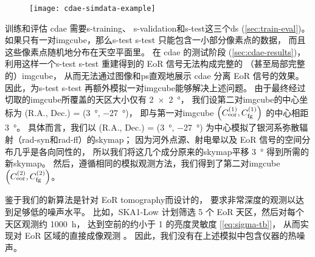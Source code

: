 \begin{figure}[htp]
  \centering
  \texttt{[image: cdae-simdata-example]}
  \label{fig:cdae-simdata}
\end{figure}

训练和评估 \ac{cdae} 需要\acl{s-training}、
\acl{s-validation}和\acl{s-test}这三个\ac{ds} (\autoref{sec:train-eval})。
如果只有一对\ac{imgcube}，那么\acl{s-test} \ac{s-test} 只能包含一小部分像素点的数据，
而且这些像素点随机地分布在天空平面里。
在 \ac{cdae} 的测试阶段 (\autoref{sec:cdae-results})，
利用这样一个\acl{s-test} \ac{s-test} 重建得到的 EoR 信号无法构成完整的
（甚至局部完整的）\ac{imgcube}，
从而无法通过图像和\ac{ps}直观地展示 \ac{cdae} 分离 EoR 信号的效果。
因此，为\acl{s-test} \ac{s-test} 再额外模拟一对\ac{imgcube}能够解决上述问题。
由于最终经过切取的\ac{imgcube}所覆盖的天区大小仅有 \SI{2 x 2}{\degree}，
我们设第二对\ac{imgcube}的中心坐标为
(R.A., Dec.\@) = (\SI{3}{\degree}, \SI{-27}{\degree})，
即与第一对\ac{imgcube}
$\left( C_{\mathrm{eor}}^{(1)}, C_{\mathrm{fg}}^{(1)} \right)$
的中心相距 \SI{3}{\degree}。
具体而言，我们以 (R.A., Dec.\@) = (\SI{3}{\degree}, \SI{-27}{\degree})
为中心模拟了银河系弥散辐射（\ac{rad-syn}和\ac{rad-ff}）的\ac{skymap}；
因为河外点源、射电晕以及 EoR 信号的空间分布几乎是各向同性的，
所以我们将这几个成分原来的\ac{skymap}平移 \SI{3}{\degree} 得到所需的新\ac{skymap}。
然后，遵循相同的模拟观测方法，我们得到了第二对\ac{imgcube}
$\left( C_{\mathrm{eor}}^{(2)}, C_{\mathrm{fg}}^{(2)} \right)$。

鉴于我们的新算法是针对 EoR \ac{tomography}而设计的，
要求非常深度的观测以达到足够低的噪声水平。
比如，SKA1-Low 计划筛选 5 个 EoR 天区，然后对每个天区观测约 \SI{1000}{\hour}，
达到空前的约小于 \SI{1}{\mK} 的亮度灵敏度 [\autoref{eq:sigma-tb}]，
从而实现对 EoR 区域的直接成像观测 \cite{mellema2013,mellema2015,koopmans2015}。
因此，我们没有在上述模拟中包含仪器的热噪声。


